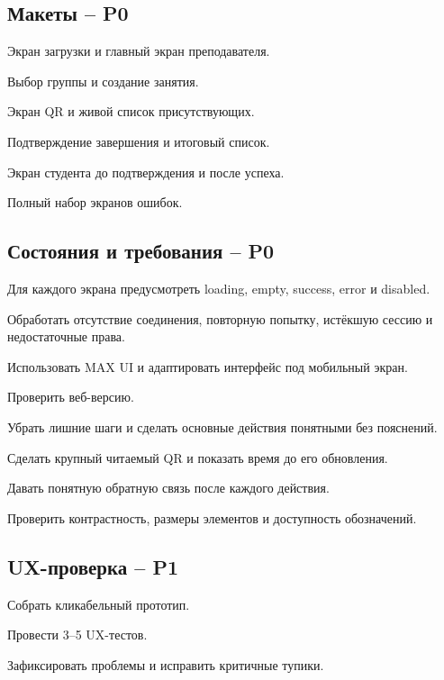 \documentclass[11pt,a4paper]{article}
\newcommand{\PZero}{\textcolor{PZero}{\textbf{P0}}}
\newcommand{\POne}{\textcolor{POne}{\textbf{P1}}}
\begin{document}
\subsection{Макеты -- \PZero}
\begin{tasklist}
  \item Экран загрузки и главный экран преподавателя.
  \item Выбор группы и создание занятия.
  \item Экран QR и живой список присутствующих.
  \item Подтверждение завершения и итоговый список.
  \item Экран студента до подтверждения и после успеха.
  \item Полный набор экранов ошибок.
\end{tasklist}

\subsection{Состояния и требования -- \PZero}
\begin{tasklist}
  \item Для каждого экрана предусмотреть loading, empty, success, error и disabled.
  \item Обработать отсутствие соединения, повторную попытку, истёкшую сессию и недостаточные права.
  \item Использовать MAX UI и адаптировать интерфейс под мобильный экран.
  \item Проверить веб-версию.
  \item Убрать лишние шаги и сделать основные действия понятными без пояснений.
  \item Сделать крупный читаемый QR и показать время до его обновления.
  \item Давать понятную обратную связь после каждого действия.
  \item Проверить контрастность, размеры элементов и доступность обозначений.
\end{tasklist}

\subsection{UX-проверка -- \POne}
\begin{tasklist}
  \item Собрать кликабельный прототип.
  \item Провести 3--5 UX-тестов.
  \item Зафиксировать проблемы и исправить критичные тупики.
\end{tasklist}
\end{document}

